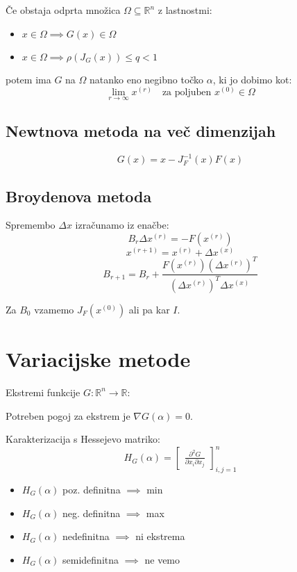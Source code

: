 \begin{multicols}{4}
Če obstaja odprta množica $\Omega \subseteq \mathbb{R}^n$ z lastnostmi:
\begin{itemize}
	\item $x \in \Omega \implies G(x) \in \Omega$
	\item $x \in \Omega \implies \rho(J_G(x)) \leq q < 1$
\end{itemize}
potem ima $G$ na $\Omega$ natanko eno negibno točko $\alpha$, ki jo dobimo kot:
\[ \lim_{r\to \infty} x^{(r)} \quad \text{za poljuben } x^{(0)} \in \Omega \]

\subsection{Newtnova metoda na več dimenzijah}
\[ G(x) = x - J_F^{-1}(x) F(x) \]

\subsection{Broydenova metoda}
Spremembo $\Delta x$ izračunamo iz enačbe:
\[ B_r \Delta x^{(r)} = -F(x^{(r)})\]
\[ x^{(r+1)} = x^{(r)} + \Delta x^{(x)}\]
\[ B_{r+1} = B_r + \frac{F(x^{(r)})(\Delta x^{(r)})^T}{ (\Delta x^{(r)})^T \Delta x^{(x)}}\]

Za $B_0$ vzamemo $J_F(x^{(0)})$ ali pa kar $I$.

\section{Variacijske metode}
Ekstremi funkcije $G: \mathbb{R}^n \to \mathbb{R}$:

Potreben pogoj za ekstrem je $\nabla G(\alpha) = 0$.

Karakterizacija s Hessejevo matriko:
\[ H_G (\alpha) = \begin{bmatrix}
	\frac{\partial^2 G}{\partial x_i \partial x_j}
\end{bmatrix}_{i,j  = 1}^n
\]
\begin{itemize}
	\item $H_G(\alpha)$ poz. definitna $\implies$ min
	\item $H_G(\alpha)$ neg. definitna $\implies$ max
	\item $H_G(\alpha)$ nedefinitna $\implies$ ni ekstrema
	\item $H_G(\alpha)$ semidefinitna $\implies$ ne vemo
\end{itemize}


\end{multicols}
